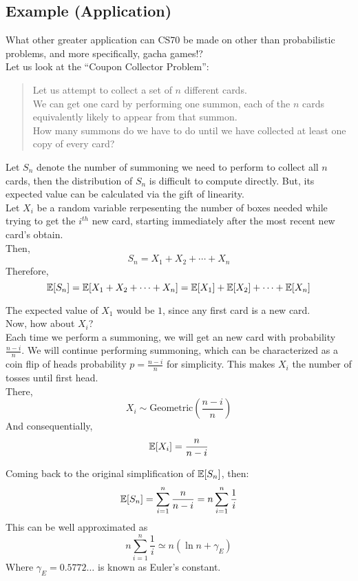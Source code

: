 \subsection{Example (Application)}
What other greater application can CS70 be made on other than probabilistic problems, and more specifically, gacha games!? \\
Let us look at the ``Coupon Collector Problem'':
\begin{quote}
    Let us attempt to collect a set of $n$ different cards. \\
    We can get one card by performing one summon, each of the $n$ cards equivalently likely to appear from that summon. \\
    How many summons do we have to do until we have collected at least one copy of every card?
\end{quote}
Let $S_n$ denote the number of summoning we need to perform to collect all $n$ cards, then the distribution of $S_n$ is difficult to compute directly. But, its expected value can be calculated via the gift of linearity. \\
Let $X_i$ be a random variable rerpesenting the number of boxes needed while trying to get the $i^{th}$ new card, starting immediately after the most recent new card's obtain. \\
Then,
\[S_n = X_1 + X_2 + \cdots + X_n\]
Therefore,
\[\mathbb{E}[S_n] = \mathbb{E}[X_1 + X_2 + \cdots + X_n] = \mathbb{E}[X_1] + \mathbb{E}[X_2] + \cdots + \mathbb{E}[X_n]\]

The expected value of $X_1$ would be $1$, since any first card is a new card. \\
Now, how about $X_i$? \\
Each time we perform a summoning, we will get an new card with probability $\frac{n - i}{n}$. We will continue performing summoning, which can be characterized as a coin flip of heads probability $p = \frac{n - i}{n}$ for simplicity. This makes $X_i$ the number of tosses until first head. \\
There, 
\[X_i \sim \text{Geometric}(\frac{n - i}{n})\]
And consequentially,
\[\mathbb{E}[X_i] = \frac{n}{n - i}\]

Coming back to the original simplification of $\mathbb{E}[S_n]$, then:
\[
    \mathbb{E}[S_n] = \sum_{i = 1}^n \frac{n}{n - i} = n\sum_{i = 1}^n \frac{1}{i}
\]
This can be well approximated as
\[
    n\sum_{i = 1}^n \frac{1}{i} \simeq n(\ln{n} + \gamma_E)
\]
Where $\gamma_E=0.5772\dots$ is known as Euler's constant.


